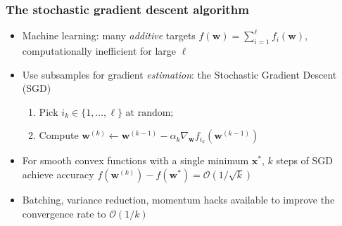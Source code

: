 \documentclass[usenames,dvipsnames,aspectratio=169]{beamer}
\begin{document}





\begin{frame}
\frametitle{The stochastic gradient descent algorithm}

\begin{itemize}

\item Machine learning: many \textit{additive} targets
$f(\mathbf{w}) = \sum\limits_{i=1}^{\ell} f_i(\mathbf{w})$,\\
computationally inefficient for large $\ell$

\pause
\item Use subsamples for gradient \textit{estimation}:
the Stochastic Gradient Descent (SGD)
\begin{enumerate}
  \item $\mbox{Pick } i_k \in \{1, \ldots, \ell\} \mbox{ at random;}$
  \item Compute 
$\mathbf{w}^{(k)} \leftarrow
\mathbf{w}^{(k-1)} - \alpha_k
  \nabla_{\mathbf{w}} f_{i_k}(\mathbf{w}^{(k-1)})$
\end{enumerate}

\pause
\item For smooth convex functions with a single minimum $\mathbf{x}^*$,
$k$ steps of SGD achieve accuracy 
$f(\mathbf{w}^{(k)}) - f(\mathbf{w}^*) = \mathcal{O}(1/\sqrt{k})$

\pause
\item Batching, variance reduction, momentum hacks available
to improve the convergence rate to $\mathcal{O}(1/k)$

\end{itemize}

\end{frame}
\end{document}

